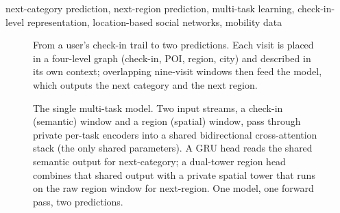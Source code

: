 \documentclass[conference]{IEEEtran}
\begin{document}
\begin{IEEEkeywords}
next-category prediction, next-region prediction, multi-task learning,
check-in-level representation, location-based social networks, mobility data
\end{IEEEkeywords}




\begin{figure}[t]\centering

\caption{From a user's check-in trail to two predictions. Each visit is placed in a
four-level graph (check-in, POI, region, city) and described in its own context; overlapping
nine-visit windows then feed the model, which outputs the next category and the next region.}
\label{fig:dataflow}
\end{figure}     %




\begin{figure}[t]\centering

\caption{The single multi-task model. Two input streams, a check-in (semantic)
window and a region (spatial) window, pass through private per-task encoders into a shared
bidirectional cross-attention stack (the only shared parameters). A GRU head reads the shared
semantic output for next-category; a dual-tower region head combines that shared output with a
private spatial tower that runs on the raw region window for next-region. One model, one
forward pass, two predictions.}
\label{fig:model}
\end{figure}        %











\end{document}
